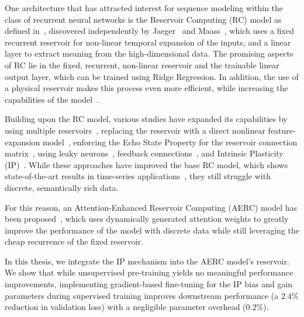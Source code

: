 \documentclass{sapthesis}
\begin{document}
One architecture that has attracted interest for sequence modeling within the class of recurrent neural networks is the Reservoir Computing (RC) model as defined in~\cite{10.1016/j.neucom.2007.12.020}, discovered independently by Jaeger~\cite{jaeger2001echo} and Maass~\cite{Maass}, which uses a fixed recurrent reservoir for non-linear temporal expansion of the inputs, and a linear layer to extract meaning from the high-dimensional data. The promising aspects of RC lie in the fixed, recurrent, non-linear reservoir and the trainable linear output layer, which can be trained using Ridge Regression. In addition, the use of a physical reservoir makes this process even more efficient, while increasing the capabilities of the model~\cite{Brunner2013ParallelPI}.

Building upon the RC model, various studies have expanded its capabilities by using multiple reservoirs~\cite{Gallicchio2016DeepRC}, replacing the reservoir with a direct nonlinear feature-expansion model~\cite{Gauthier_2021}, enforcing the Echo State Property for the reservoir connection matrix~\cite{jaeger2001echo}, using leaky neurons~\cite{JAEGER2007335}, feedback connections~\cite{Lukosevicius2007}, and Intrinsic Plasticity (IP)~\cite{10.1007/11550822_11,10.1016/j.neucom.2007.12.020}.
While these approaches have improved the base RC model, which shows state-of-the-art results in time-series applications~\cite{ferte2024reservoir}, they still struggle with discrete, semantically rich data.

For this reason, an Attention-Enhanced Reservoir Computing (AERC) model has been proposed~\cite{koster2024attentionenhancedreservoircomputing}, which uses dynamically generated attention weights to greatly improve the performance of the model with discrete data while still leveraging the cheap recurrence of the fixed reservoir.

In this thesis, we integrate the IP mechanism into the AERC model's reservoir. We show that while unsupervised pre-training yields no meaningful performance improvements, implementing gradient-based fine-tuning for the IP bias and gain parameters during supervised training improves downstream performance (a $2.4\%$ reduction in validation loss) with a negligible parameter overhead ($0.2\%$).
\end{document}
